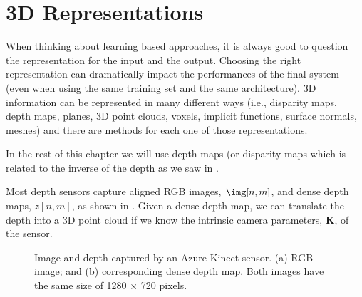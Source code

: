 \section{3D Representations}

When thinking about learning based approaches, it is always good to question the representation for the input and the output. Choosing the right representation can dramatically impact the performances of the final system (even when using the same training set and the same architecture). 3D information can be represented in many different ways (i.e., disparity maps, depth maps, planes, 3D point clouds, voxels, implicit functions, surface normals, meshes) and there are methods for each one of those representations. 



In the rest of this chapter we will use depth maps (or disparity maps which is related to the inverse of the depth as we saw in \chap{\ref{chap:stereo_vision}}.

Most depth sensors capture aligned RGB images, $\img [n,m]$, and dense depth maps, $z [n,m]$, as shown in \fig{\ref{fig:kinect}}. Given a dense depth map, we can translate the depth into a 3D point cloud if we know the intrinsic camera parameters, $\mathbf{K}$, of the sensor. 



\begin{figure}[t]
\centerline{
}
\caption{Image and depth captured by an Azure Kinect sensor. (a) RGB image; and (b) corresponding dense depth map. Both images have the same size of 1280 $\times$ 720 pixels.}
\label{fig:kinect}
\end{figure}



